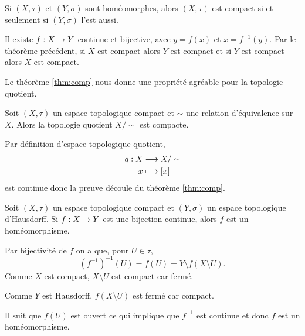 \documentclass[french]{article}
\begin{document}
\begin{cor}
  Si $(X, \tau)$ et $(Y, \sigma)$ sont homéomorphes, alors $(X, \tau)$ est compact si et seulement si $(Y, \sigma)$ l'est aussi.

  \tcblower
  \begin{preuve}
    Il existe $f: X \rightarrow Y$ continue et bijective, avec $y = f(x)$ et  $x = f^{-1}(y)$. Par le théorème précédent, si $X$ est compact alors $Y$ est compact et si $Y$ est compact alors $X$ est compact.
  \end{preuve}
\end{cor}

Le théorème \ref{thm:comp} nous donne une propriété agréable pour la topologie quotient.

\begin{cor}
  Soit $(X, \tau)$ un espace topologique compact et $\sim$ une relation d'équivalence sur $X$. Alors la topologie quotient  $X /\sim$ est compacte.

  \tcblower
  \begin{preuve}
    Par définition d'espace topologique quotient,
    \begin{align*}
      q: X &\longrightarrow X / \sim \\
      x &\longmapsto [x]
    \end{align*}
    est continue donc la preuve découle du théorème \ref{thm:comp}.
  \end{preuve}
\end{cor}


\begin{theoreme}
  Soit $(X, \tau)$ un espace topologique compact et $(Y, \sigma)$ un espace topologique d'Hausdorff. Si $f: X \rightarrow Y$ est une bijection continue, alors $f$ est un homéomorphisme.

  \tcblower
  \begin{preuve}
    Par bijectivité de $f$ on a que, pour  $U \in \tau$,
    $$\left(f^{-1} \right)^{-1}(U) = f(U) = Y \setminus f(X \setminus U).$$
    Comme $X$ est compact, $X \setminus U$ est compact car fermé.
    \par Comme $Y$ est Hausdorff, $f(X \setminus U)$ est fermé car compact.
    \par Il suit que  $f(U)$ est ouvert ce qui implique que $f^{-1}$ est continue et donc $f$ est un homéomorphisme.
  \end{preuve}
\end{theoreme}
\end{document}
